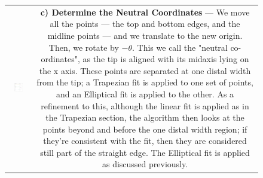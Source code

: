 \begin{figure}[h!]
\begin{tabular}{cc}
    \\ 
   \includegraphics[width=0.45\textwidth, height=0.5\textwidth]{Chapter4/Figs/Model_NeutralCoords.jpg} &
    \parbox[b][0.5\textwidth][s]{0.55\textwidth}{
         \textbf{c) Determine the Neutral Coordinates} --- We move all the points --- the top and bottom edges, and the midline points --- and we translate to the new origin. Then, we rotate by $-\theta$. This we call the "neutral co-ordinates", as the tip is aligned with its midaxis lying on the x axis. These points are separated at one distal width from the tip; a Trapezian fit is applied to one set of points, and an Elliptical fit is applied to the other. As a refinement to this, although the linear fit is applied as in the Trapezian section, the algorithm then looks at the points beyond and before the one distal width region; if they're consistent with the fit, then they are considered still part of the straight edge. The Elliptical fit is applied as discussed previously. \vfill
    }
    \end{tabular}\\
\end{figure}


